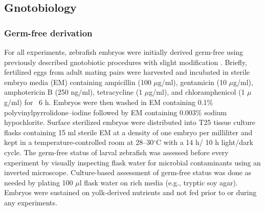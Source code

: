 \subsection{Gnotobiology}

\subsubsection{Germ-free derivation}
For all experiments, zebrafish embryos were initially derived germ-free using previously described gnotobiotic procedures with slight modification \cite{melancon_best_2017}. Briefly, fertilized eggs from adult mating pairs were harvested and incubated in sterile embryo media (EM) containing ampicillin (100 $\mu$g/ml), gentamicin (10 $\mu$g/ml), amphotericin B (250 ng/ml), tetracycline (1 $\mu$g/ml), and chloramphenicol (1 $\mu$g/ml) for ~6 h. Embryos were then washed in EM containing 0.1\% polyvinylpyrrolidone–iodine followed by EM containing 0.003\% sodium hypochlorite. Surface sterilized embryos were distributed into T25 tissue culture flasks containing 15 ml sterile EM at a density of one embryo per milliliter and kept in a temperature-controlled room at 28–30$^\circ$C with a 14 h/ 10 h light/dark cycle. The germ-free status of larval zebrafish was assessed before every experiment by visually inspecting flask water for microbial contaminants using an inverted microscope. Culture-based assessment of germ-free status was done as needed by plating 100 $\mu$l flask water on rich media (e.g., tryptic soy agar). Embryos were sustained on yolk-derived nutrients and not fed prior to or during any experiments. 

